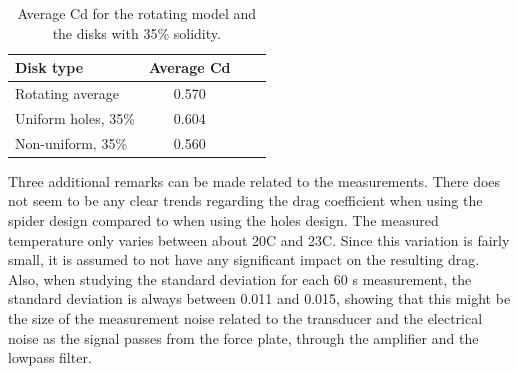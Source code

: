 \begin{table}
    \centering
    \begin{tabular}{l c c r}
         Disk type & Average Cd \\
         \hline
         Rotating average & 0.570 \\
         Uniform holes, 35\% & 0.604  \\
         Non-uniform, 35\% & 0.560 \\
    \end{tabular}
    \caption{Average Cd for the rotating model and the disks with 35\% solidity.}
    \label{tab:AvgCD}
\end{table}









Three additional remarks can be made related to the measurements. There does not seem to be any clear trends regarding the drag coefficient when using the \gls{spider} design compared to when using the \gls{holes} design. The measured temperature only varies between about 20\degree C and 23\degree C. Since this variation is fairly small, it is assumed to not have any significant impact on the resulting drag. Also, when studying the standard deviation for each 60 \si{\s} measurement, the standard deviation is always between 0.011 and 0.015, showing that this might be the size of the measurement noise related to the transducer and the electrical noise as the signal passes from the force plate, through the amplifier and the lowpass filter. 


